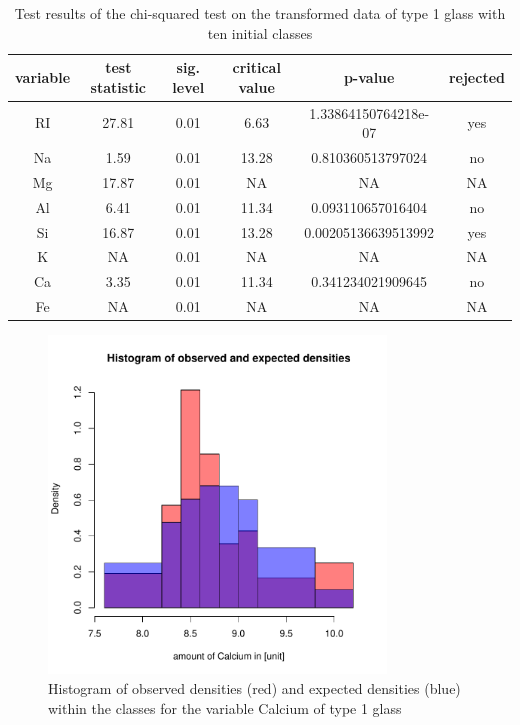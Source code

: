 \documentclass[a4paper, 12pt, titlepage, headsepline, listof = totoc, bibliography = totoc, numbers = noenddot]{scrartcl}
\begin{document}
\begin{table}[h!]
\centering
\begin{tabular}{|cccccc|} \hline variable & test statistic & sig. level & critical value & p-value & rejected\\ \hline RI & 27.81 & 0.01 & 6.63 & 1.33864150764218e-07 & yes\\ 
Na & 1.59 & 0.01 & 13.28 & 0.810360513797024 & no\\ 
Mg & 17.87 & 0.01 & NA & NA & NA\\ 
Al & 6.41 & 0.01 & 11.34 & 0.093110657016404 & no\\ 
Si & 16.87 & 0.01 & 13.28 & 0.00205136639513992 & yes\\ 
K & NA & 0.01 & NA & NA & NA\\ 
Ca & 3.35 & 0.01 & 11.34 & 0.341234021909645 & no\\ 
Fe & NA & 0.01 & NA & NA & NA\\ \hline \end{tabular}\caption{Test results of the chi-squared test on the transformed data of type 1 glass with ten initial classes}
\label{tab:chi-type1-trans}
\end{table}



\begin{figure}[h!]
\centering
\includegraphics[width=0.8\textwidth]{report-chisqType1Ca}
\caption{Histogram of observed densities (red) and expected densities (blue) within the classes for the variable Calcium of type 1 glass}
\label{fig:chisqType1Ca}
\end{figure}
\end{document}
